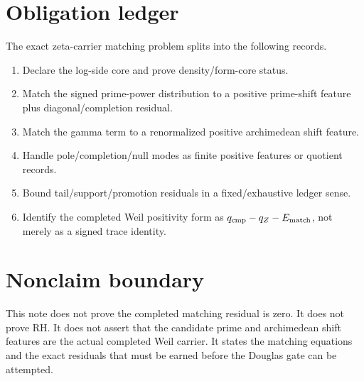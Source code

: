 \documentclass[11pt]{article}
\begin{document}
\section{Obligation ledger}
The exact zeta-carrier matching problem splits into the following records.
\begin{enumerate}[label=O1.\arabic*]
  \item Declare the log-side core and prove density/form-core status.
  \item Match the signed prime-power distribution to a positive prime-shift feature plus diagonal/completion residual.
  \item Match the gamma term to a renormalized positive archimedean shift feature.
  \item Handle pole/completion/null modes as finite positive features or quotient records.
  \item Bound tail/support/promotion residuals in a fixed/exhaustive ledger sense.
  \item Identify the completed Weil positivity form as \(q_{\rm cmp}-q_Z-E_{\rm match}\), not merely as a signed trace identity.
\end{enumerate}

\section{Nonclaim boundary}
This note does not prove the completed matching residual is zero.  It does not prove RH.  It does not assert that the candidate prime and archimedean shift features are the actual completed Weil carrier.  It states the matching equations and the exact residuals that must be earned before the Douglas gate can be attempted.
\end{document}
